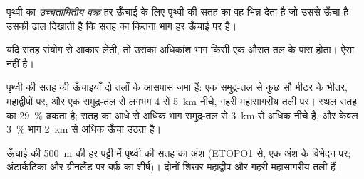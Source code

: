 \begin{definition}[उच्चतामितीय वक्र]\label{def:g11:lithosphere-asthenosphere:hypsometry}
पृथ्वी का \emph{उच्चतामितीय वक्र} हर
ऊँचाई के लिए पृथ्वी की सतह का वह भिन्न देता है जो उससे ऊँचा है।
उसकी ढाल दिखाती है कि सतह का कितना भाग हर ऊँचाई पर है।
\end{definition}

यदि सतह संयोग से आकार लेती, तो उसका अधिकांश भाग किसी एक
औसत तल के पास होता। ऐसा नहीं है।

\begin{proposition}[दो तल]\label{prop:g11:lithosphere-asthenosphere:two-levels}
पृथ्वी की सतह की ऊँचाइयाँ दो तलों के आसपास जमा हैं: एक समुद्र-तल से
कुछ सौ मीटर के भीतर, महाद्वीपों पर, और एक समुद्र-तल से लगभग 4 से
\qty{5}{km} नीचे, गहरी महासागरीय तली पर। स्थल सतह का \qty{29}{\percent}
ढकता है; सतह का आधे से अधिक भाग समुद्र-तल से \qty{3}{km} से अधिक
नीचे है, और केवल \qty{3}{\percent} भाग \qty{2}{km} से अधिक ऊँचा उठता है।
\end{proposition}

\begin{omfigure}

{\small ऊँचाई की \qty{500}{m} की हर पट्टी में पृथ्वी की सतह का अंश
(ETOPO1 से, एक अंश के विभेदन पर; अंटार्कटिका और ग्रीनलैंड पर
बर्फ़ का शीर्ष)। दोनों शिखर महाद्वीप और गहरी महासागरीय तली हैं।}
\end{omfigure}

